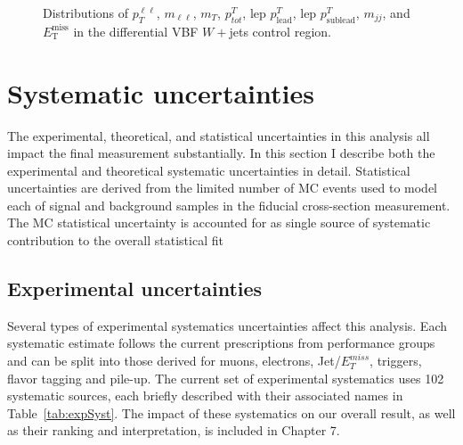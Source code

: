 \begin{figure}[!h]
  \hfill
{\caption{Distributions of $p_T^{\ell\ell}$, $m_{\ell\ell}$, $m_T$, $p^T_{tot}$, lep $p^T_{\text{lead}}$, lep $p^T_{\text{sublead}}$, $m_{jj}$, and $\ensuremath{E_{\text{T}}^{\text{miss}}}$ in the differential VBF $W+$jets control region.
\label{fig:WCR}}}
\end{figure}  

\section{Systematic uncertainties}
The experimental, theoretical, and statistical uncertainties in this analysis all impact the final measurement substantially. In this section I describe both the experimental and theoretical systematic uncertainties in detail. Statistical uncertainties are derived from the limited number of MC events used to model each of signal and background samples in the fiducial cross-section measurement. The MC statistical uncertainty is accounted for as single source of systematic contribution to the overall statistical fit

\subsection{Experimental uncertainties}
Several types of experimental systematics uncertainties affect this analysis. Each systematic estimate follows the current prescriptions from performance groups and can be split into those derived for muons, electrons, Jet/$E_T^{miss}$, triggers, flavor tagging and pile-up. The current set of experimental systematics uses 102  systematic sources, each briefly described with their associated names in Table~\ref{tab:expSyst}. The impact of these systematics on our overall result, as well as their ranking and interpretation, is included in Chapter 7. 
 
